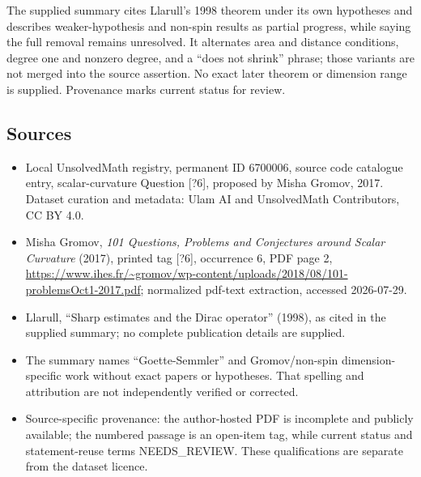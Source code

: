 \documentclass[11pt]{article}
\begin{document}
The supplied summary cites Llarull's 1998 theorem under its own hypotheses and describes weaker-hypothesis and non-spin results as partial progress, while saying the full removal remains unresolved. It alternates area and distance conditions, degree one and nonzero degree, and a ``does not shrink'' phrase; those variants are not merged into the source assertion. No exact later theorem or dimension range is supplied. Provenance marks current status for review.
\subsection{Sources}
\begin{itemize}
\item Local UnsolvedMath registry, permanent ID 6700006, source code catalogue entry, scalar-curvature Question [?6], proposed by Misha Gromov, 2017. Dataset curation and metadata: Ulam AI and UnsolvedMath Contributors, CC BY 4.0.
\item Misha Gromov, \emph{101 Questions, Problems and Conjectures around Scalar Curvature} (2017), printed tag [?6], occurrence 6, PDF page 2, \url{https://www.ihes.fr/~gromov/wp-content/uploads/2018/08/101-problemsOct1-2017.pdf}; normalized pdf-text extraction, accessed 2026-07-29.
\item Llarull, ``Sharp estimates and the Dirac operator'' (1998), as cited in the supplied summary; no complete publication details are supplied.
\item The summary names ``Goette-Semmler'' and Gromov/non-spin dimension-specific work without exact papers or hypotheses. That spelling and attribution are not independently verified or corrected.
\item Source-specific provenance: the author-hosted PDF is incomplete and publicly available; the numbered passage is an open-item tag, while current status and statement-reuse terms NEEDS\_REVIEW. These qualifications are separate from the dataset licence.
\end{itemize}
\end{document}
